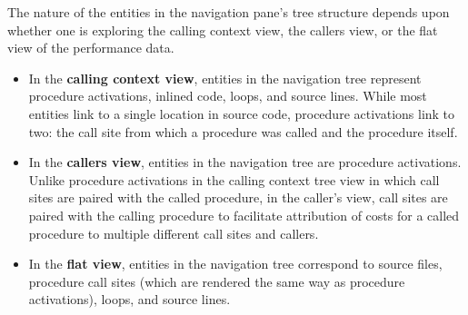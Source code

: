 \documentclass[a4paper,11pt]{article}
\begin{document}
 The nature of the entities in the navigation pane's tree structure depends  upon whether one is exploring the calling context view, the  callers view, or the flat view of the performance data.  
\begin{itemize}
	\item  In the \textbf{calling context view}, entities in the navigation tree represent  procedure activations, inlined code, loops, and source lines. While  most entities link to a single location in source code, procedure  activations link to two: the call site from which a procedure was  called and the procedure itself. 
	\item  In the \textbf{callers view}, entities in the navigation tree are procedure  activations. Unlike procedure activations in the calling context  tree view in which call sites are paired with the called procedure,  in the caller's view, call sites are paired with the calling procedure  to facilitate attribution of costs for a called procedure to multiple  different call sites and callers. 
	\item  In the \textbf{flat view}, entities in the navigation tree correspond to source  files, procedure call sites (which are rendered the same way as  procedure activations), loops, and source lines.  
\end{itemize}
\end{document}
